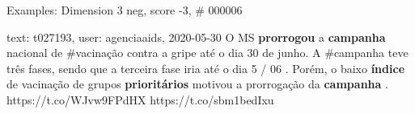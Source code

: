 \begin{frame}{Examples: Dimension 3 neg, score -3, \# 000006}
\footnotesize
\begin{alertblock}{text: t027193, user: agenciaaids, 2020-05-30}
O MS \textbf{prorrogou} a \textbf{campanha} nacional de \#vacinação contra a 
gripe até o dia 30 de junho. A \#campanha teve três fases, sendo que a terceira 
fase iria até o dia 5 / 06 . Porém, o baixo \textbf{índice} de vacinação de 
grupos \textbf{prioritários} motivou a prorrogação da \textbf{campanha} . 
https://t.co/WJvw9FPdHX https://t.co/sbm1bedIxu 
\end{alertblock}
\end{frame}
